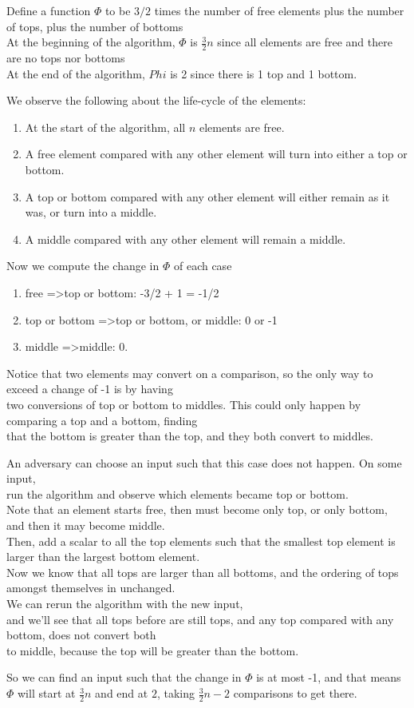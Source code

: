 \documentclass[11pt]{article}
\begin{document}
Define a function $\Phi$ to be $3/2$ times the number of free elements plus the number of tops, plus the number of bottoms\\
At the beginning of the algorithm, $\Phi$ is $\frac{3}{2} n$ since all elements are free and there are no tops nor bottoms\\
At the end of the algorithm, $Phi$ is 2 since there is 1 top and 1 bottom.

We observe the following about the life-cycle of the elements:

\begin{enumerate}
\item At the start of the algorithm, all $n$ elements are free.
\item A free element compared with any other element will turn into either a top or bottom.
\item A top or bottom compared with any other element will either remain as it was, or turn into a middle.
\item A middle compared with any other element will remain a middle.
\end{enumerate}

Now we compute the change in $\Phi$ of each case

\begin{enumerate}
\item free =\textgreater top or bottom: -3/2 + 1 = -1/2
\item top or bottom =\textgreater top or bottom, or middle: 0 or -1
\item middle =\textgreater middle: 0.
\end{enumerate}

Notice that two elements may convert on a comparison, so the only way to exceed a change of -1 is by having\\
two conversions of top or bottom to middles. This could only happen by comparing a top and a bottom, finding\\
that the bottom is greater than the top, and they both convert to middles.

An adversary can choose an input such that this case does not happen. On some input,\\
run the algorithm and observe which elements became top or bottom.\\
Note that an element starts free, then must become only top, or only bottom, and then it may become middle.\\
Then, add a scalar to all the top elements such that the smallest top element is larger than the largest bottom element.\\
Now we know that all tops are larger than all bottoms, and the ordering of tops amongst themselves in unchanged.\\
We can rerun the algorithm with the new input,\\
and we'll see that all tops before are still tops, and any top compared with any bottom, does not convert both\\
to middle, because the top will be greater than the bottom.

So we can find an input such that the change in $\Phi$ is at most -1, and that means $\Phi$ will
start at $\frac{3}{2} n$ and end at $2$, taking $\frac{3}{2} n - 2$ comparisons to get there.
\end{document}
